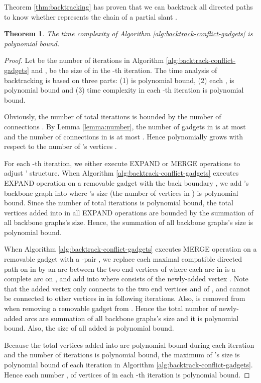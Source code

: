 \documentclass[11pt]{article}
\newtheorem{theorem}[figure]{Theorem}
\begin{document}
Theorem \ref{thm:backtracking} has proven that
we can backtrack all directed paths 
to know whether  represents
the chain of a partial slant  .

\begin{theorem}\label{thm:backtracking-time}
The time complexity of Algorithm \ref{alg:backtrack-conflict-gadgets} is polynomial bound.
\end{theorem}

\begin{proof}



Let  be the number of iterations in Algorithm \ref{alg:backtrack-conflict-gadgets}
and , be the size of  in the -th iteration.
The time analysis of backtracking is based on three parts:
(1)  is polynomial bound,
(2) each , is polynomial bound and
(3) time complexity  in each -th iteration is polynomial bound.


Obviously, the number  of total iterations is bounded by the number of connections .
By Lemma \ref{lemma:number}, the number of gadgets in  is at most  and the number
of connections in  is at most .
Hence  polynomially grows with respect to the number of 's vertices .

For each -th iteration, we either execute EXPAND or MERGE operations to adjust ' structure.
When Algorithm \ref{alg:backtrack-conflict-gadgets} executes EXPAND operation on a removable gadget  with the back boundary ,
we add 's backbone graph  into  where 's size (the number of vertices
in ) is polynomial bound.
Since the number  of total iterations is polynomial bound,
the total vertices added into  in all EXPAND operations are bounded
by the summation of all backbone graphs's size.
Hence, the summation of all backbone graphs's size is polynomial bound.

When Algorithm \ref{alg:backtrack-conflict-gadgets} executes MERGE operation
on a removable gadget  with a -pair ,
we replace each maximal compatible directed path  on  in  by
an arc  between the two end vertices of  where
each arc in  is a complete arc on , and
add  into  where  consists of the newly-added vertex .
Note that the added vertex  only connects to the two end vertices  and  of ,
and cannot be connected to other vertices in  in following iterations.
Also,  is removed from  when removing a removable gadget  from .
Hence the total number of newly-added arcs  are summation of all backbone graphs's size and
it is polynomial bound.
Also, the size of all added  is polynomial bound.

Because the total vertices added into  are polynomial bound during each iteration
and the number  of iterations is polynomial bound,
the maximum of 's size is polynomial bound of each iteration
in Algorithm \ref{alg:backtrack-conflict-gadgets}.
Hence each number , of vertices of  in
each -th iteration is polynomial bound.


\end{proof}
\end{document}
